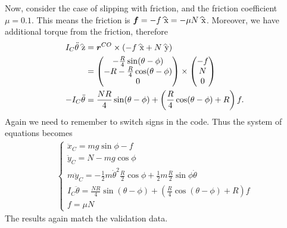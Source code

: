 \documentclass[12pt]{article}
\begin{document}
Now, consider the case of slipping with friction, and the friction coefficient $ \mu = 0.1$. This means the friction is $ \ve{ f}  = -f \wh{ x} = - \mu N \wh{ x}$. Moreover, we have additional torque from the friction, therefore
\begin{align*}
	I_C \ddot{\theta} \wh{ z} &=\ve{ r}^{CO} \times  (-f \wh{ x} + N \wh{ y}) \\
	&= \begin{pmatrix} -\frac{R}{4} \sin(\theta-\phi) \\ -R-\frac{R}{4} \cos(\theta-\phi)\\0 \end{pmatrix} \times   \begin{pmatrix} -f\\N\\0 \end{pmatrix} \\
	-I_C \ddot{\theta} &= \frac{NR}{4} \sin(\theta - \phi) + \left( \frac{R}{4} \cos(\theta - \phi) +R \right) f .
\end{align*}
Again we need to remember to switch signs in the code. Thus the system of equations becomes
\begin{align*}
\begin{cases}
	\ddot{x}_C = mg \sin\phi-f\\
	\ddot{y}_C = N - mg \cos \phi \\
	m \ddot{y}_C = - \frac{1}{2}m \dot{\theta}^2 \frac{R}{2} \cos \phi + \frac{1}{2}m \frac{R}{2} \sin \phi \dot{\theta} \\
	I_C \ddot{\theta} = \frac{NR}{4} \sin(\theta - \phi) + \left( \frac{R}{4} \cos(\theta - \phi) +R \right) f \\
	f = \mu N
\end{cases}
\end{align*}
The results again match the validation data.
\end{document}
